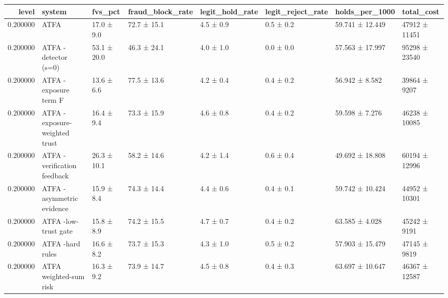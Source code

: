 \begin{tabular}{rlllllll}
\toprule
level & system & fvs\_pct & fraud\_block\_rate & legit\_hold\_rate & legit\_reject\_rate & holds\_per\_1000 & total\_cost \\
\midrule
0.200000 & ATFA & 17.0 ± 9.0 & 72.7 ± 15.1 & 4.5 ± 0.9 & 0.5 ± 0.2 & 59.741 ± 12.449 & 47912 ± 11451 \\
0.200000 & ATFA -detector (s=0) & 53.1 ± 20.0 & 46.3 ± 24.1 & 4.0 ± 1.0 & 0.0 ± 0.0 & 57.563 ± 17.997 & 95298 ± 23540 \\
0.200000 & ATFA -exposure term F & 13.6 ± 6.6 & 77.5 ± 13.6 & 4.2 ± 0.4 & 0.4 ± 0.2 & 56.942 ± 8.582 & 39864 ± 9207 \\
0.200000 & ATFA -exposure-weighted trust & 16.4 ± 9.4 & 73.3 ± 15.9 & 4.6 ± 0.8 & 0.4 ± 0.2 & 59.598 ± 7.276 & 46238 ± 10085 \\
0.200000 & ATFA -verification feedback & 26.3 ± 10.1 & 58.2 ± 14.6 & 4.2 ± 1.4 & 0.6 ± 0.4 & 49.692 ± 18.808 & 60194 ± 12996 \\
0.200000 & ATFA -asymmetric evidence & 15.9 ± 8.4 & 74.3 ± 14.4 & 4.4 ± 0.6 & 0.4 ± 0.1 & 59.742 ± 10.424 & 44952 ± 10301 \\
0.200000 & ATFA -low-trust gate & 15.8 ± 8.9 & 74.2 ± 15.5 & 4.7 ± 0.7 & 0.4 ± 0.2 & 63.585 ± 4.028 & 45242 ± 9191 \\
0.200000 & ATFA -hard rules & 16.6 ± 8.2 & 73.7 ± 15.3 & 4.3 ± 1.0 & 0.5 ± 0.2 & 57.903 ± 15.479 & 47145 ± 9819 \\
0.200000 & ATFA weighted-sum risk & 16.3 ± 9.2 & 73.9 ± 14.7 & 4.5 ± 0.8 & 0.4 ± 0.3 & 63.697 ± 10.647 & 46367 ± 12587 \\
\bottomrule
\end{tabular}

